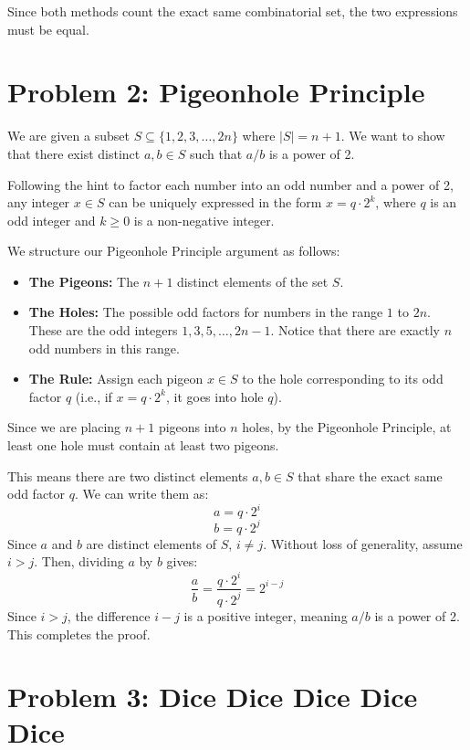 \documentclass[11pt]{article}
\begin{document}
Since both methods count the exact same combinatorial set, the two expressions must be equal.

\vspace{0.5cm}

\section*{Problem 2: Pigeonhole Principle}

We are given a subset $S \subseteq \{1, 2, 3, \dots, 2n\}$ where $|S| = n + 1$. We want to show that there exist distinct $a, b \in S$ such that $a/b$ is a power of 2.

Following the hint to factor each number into an odd number and a power of 2, any integer $x \in S$ can be uniquely expressed in the form $x = q \cdot 2^k$, where $q$ is an odd integer and $k \ge 0$ is a non-negative integer.

We structure our Pigeonhole Principle argument as follows:
\begin{itemize}
    \item \textbf{The Pigeons:} The $n+1$ distinct elements of the set $S$.
    \item \textbf{The Holes:} The possible odd factors for numbers in the range $1$ to $2n$. These are the odd integers $1, 3, 5, \dots, 2n-1$. Notice that there are exactly $n$ odd numbers in this range.
    \item \textbf{The Rule:} Assign each pigeon $x \in S$ to the hole corresponding to its odd factor $q$ (i.e., if $x = q \cdot 2^k$, it goes into hole $q$).
\end{itemize}

Since we are placing $n+1$ pigeons into $n$ holes, by the Pigeonhole Principle, at least one hole must contain at least two pigeons. 

This means there are two distinct elements $a, b \in S$ that share the exact same odd factor $q$. We can write them as:
$$ a = q \cdot 2^i $$
$$ b = q \cdot 2^j $$
Since $a$ and $b$ are distinct elements of $S$, $i \neq j$. Without loss of generality, assume $i > j$. 
Then, dividing $a$ by $b$ gives:
$$ \frac{a}{b} = \frac{q \cdot 2^i}{q \cdot 2^j} = 2^{i-j} $$
Since $i > j$, the difference $i-j$ is a positive integer, meaning $a/b$ is a power of 2. This completes the proof.

\vspace{0.5cm}

\section*{Problem 3: Dice Dice Dice Dice Dice}
\end{document}
